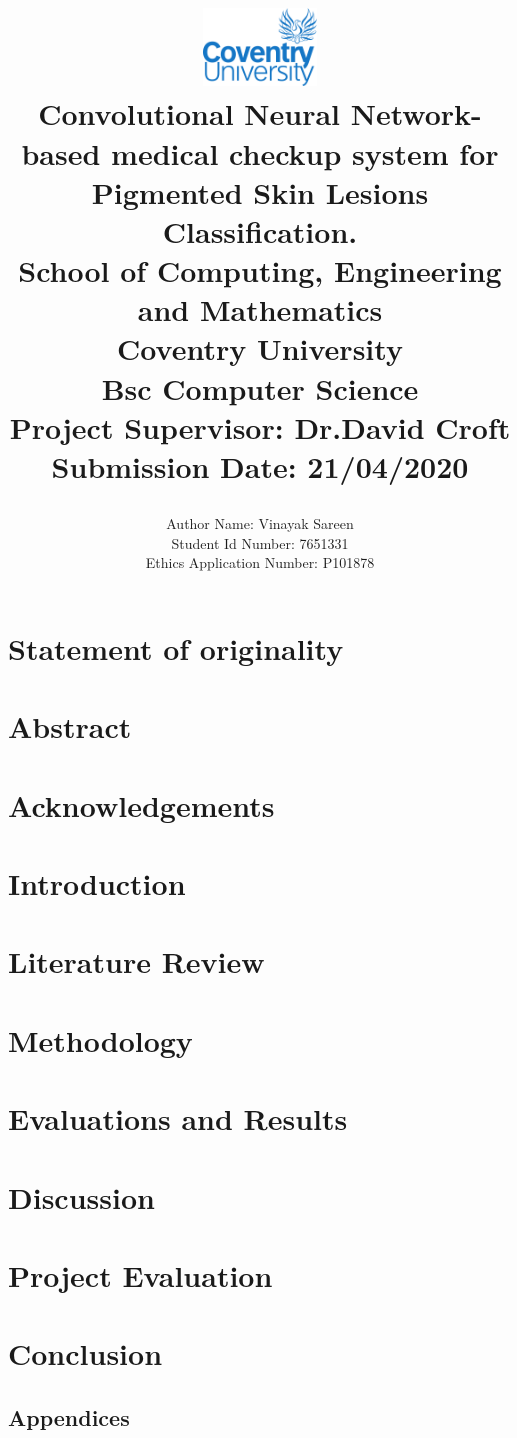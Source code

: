 \documentclass{report}
\title{
	\begin{center}
	\includegraphics[width=3cm]{Images/covlogo.png} \\
	\vspace{2mm}
	{Convolutional Neural Network-based medical checkup system for Pigmented Skin Lesions Classification.} \\
	\vspace{5mm} %
	\large {
		{School of Computing, Engineering and Mathematics}\\
		{Coventry University}\\
	}
	\vspace{3mm} %
	\textbf{ Bsc Computer Science}\\
	{\large Project Supervisor: Dr.David Croft}\\
	{\large Submission Date: 21/04/2020} \\
	\end{center}
}
\author{
	{\large Author Name:  Vinayak Sareen} \\
	{\large Student Id Number:  7651331} \\
	{\large Ethics Application Number: P101878 }\\
}
\date{}
\begin{document}
\maketitle

\chapter*{Statement of originality}


\chapter*{Abstract}


\tableofcontents

\chapter*{Acknowledgements}


\chapter{Introduction}


\chapter{Literature Review}


\chapter{Methodology}


\chapter{Evaluations and Results}


\chapter{Discussion}


\chapter{Project Evaluation}


\chapter{Conclusion}




\pagebreak
\thispagestyle{plain}
\section*{Appendices}

\end{document}
